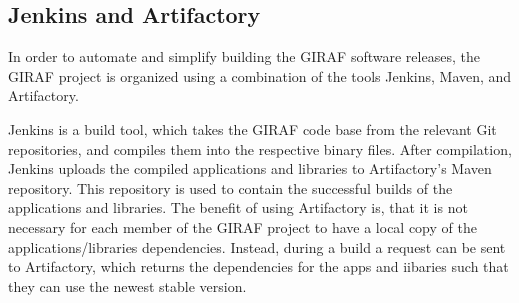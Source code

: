 \subsection{Jenkins and Artifactory}
In order to automate and simplify building the GIRAF software releases, the
GIRAF project is organized using a combination of the tools Jenkins, Maven, and
Artifactory.\nl

Jenkins is a build tool, which takes the GIRAF code base from the relevant Git
repositories, and compiles them into the respective binary files. After
compilation, Jenkins uploads the compiled applications and libraries to
Artifactory's Maven repository. This repository is used to contain the
successful builds of the applications and libraries. The benefit of using
Artifactory is, that it is not necessary for each member of the GIRAF project to
have a local copy of the applications/libraries dependencies. Instead, during a
build a request can be sent to Artifactory, which returns the dependencies for
the apps and iibaries such that they can use the newest stable version.

